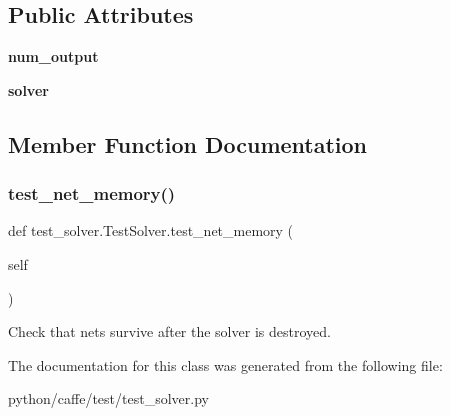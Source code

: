 \subsection*{Public Attributes}
\begin{DoxyCompactItemize}
\item 
\mbox{\label{classtest__solver_1_1_test_solver_ae9727355daa663ba0a24cb7a28760b76}} 
{\bfseries num\+\_\+output}
\item 
\mbox{\label{classtest__solver_1_1_test_solver_a85495400c6668028c584367ded1521e5}} 
{\bfseries solver}
\end{DoxyCompactItemize}


\subsection{Member Function Documentation}
\mbox{\label{classtest__solver_1_1_test_solver_a96cd6dd0b2efecf67ee792f6f996a025}} 
\subsubsection{\texorpdfstring{test\+\_\+net\+\_\+memory()}{test\_net\_memory()}}
{\footnotesize\ttfamily def test\+\_\+solver.\+Test\+Solver.\+test\+\_\+net\+\_\+memory (\begin{DoxyParamCaption}\item[{}]{self }\end{DoxyParamCaption})}

\begin{DoxyVerb}Check that nets survive after the solver is destroyed.\end{DoxyVerb}
 

The documentation for this class was generated from the following file\+:\begin{DoxyCompactItemize}
\item 
python/caffe/test/test\+\_\+solver.\+py\end{DoxyCompactItemize}
